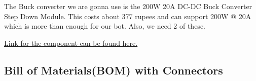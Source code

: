 \documentclass[12pt]{article}
\begin{document}
The Buck converter we are gonna use is the 200W 20A DC-DC Buck Converter Step Down Module. This costs about 377 rupees and can support 200W @ 20A which is more than enough for our bot. Also, we need 2 of these.

\href{https://robu.in/product/200w-20a-dc-dc-buck-converter-step-down-module-constant-current-led-driver-module/?gad_source=1&gad_campaignid=21296336107&gbraid=0AAAAADvLFWdQV_NmhL7_RL-sDvi3f9UYE&gclid=CjwKCAjw_pDBBhBMEiwAmY02NigvhYmL5dfnNkIpkMI6ZSgK__W7klu7-KI32NOlZP0E0lytgsm1FhoCZkYQAvD_BwE#tab-questions}{Link for the component can be found here.}

\subsection*{Bill of Materials(BOM) with Connectors}
\end{document}
